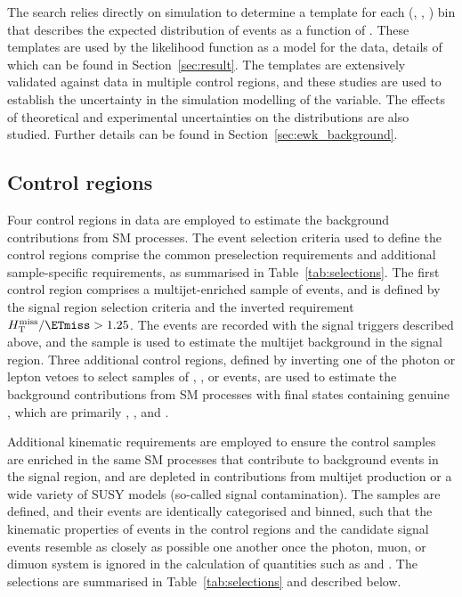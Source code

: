 The search relies directly on simulation to determine a template for
each (\njet, \nb, \scalht) bin that describes the expected
distribution of events as a function of \HTmiss. These templates are
used by the likelihood function as a model for the data, details of
which can be found in Section~\ref{sec:result}. The templates are
extensively validated against data in multiple control regions, and
these studies are used to establish the uncertainty in the simulation
modelling of the \HTmiss variable. The effects of theoretical and
experimental uncertainties on the \HTmiss distributions are also
studied. Further details can be found in
Section~\ref{sec:ewk_background}.


\subsection{Control regions}
\label{sec:control_regions}

Four control regions in data are employed to estimate the background
contributions from SM processes. The event selection criteria used to
define the control regions comprise the common preselection
requirements and additional sample-specific requirements, as
summarised in Table~\ref{tab:selections}. The first control region
comprises a multijet-enriched sample of events, and is defined by the
signal region selection criteria and the inverted requirement $\HTmiss
/ \ETmiss > 1.25$. The events are recorded with the signal triggers
described above, and the sample is used to estimate the multijet
background in the signal region. Three additional control regions,
defined by inverting one of the photon or lepton vetoes to select
samples of \gj, \mj, or \mmj events, are used to estimate the
background contributions from SM processes with final states
containing genuine \ptvecmiss, which are primarily \ttbar, \wlj, and
\znunuj.

Additional kinematic requirements are employed to ensure the control
samples are enriched in the same SM processes that contribute to
background events in the signal region, and are depleted in
contributions from multijet production or a wide variety of SUSY
models (\ie so-called signal contamination).  The samples are defined,
and their events are identically categorised and binned, such that the
kinematic properties of events in the control regions and the
candidate signal events resemble as closely as possible one another
once the photon, muon, or dimuon system is ignored in the calculation
of quantities such as \scalht and \HTmiss. The selections are
summarised in Table~\ref{tab:selections} and described below.

